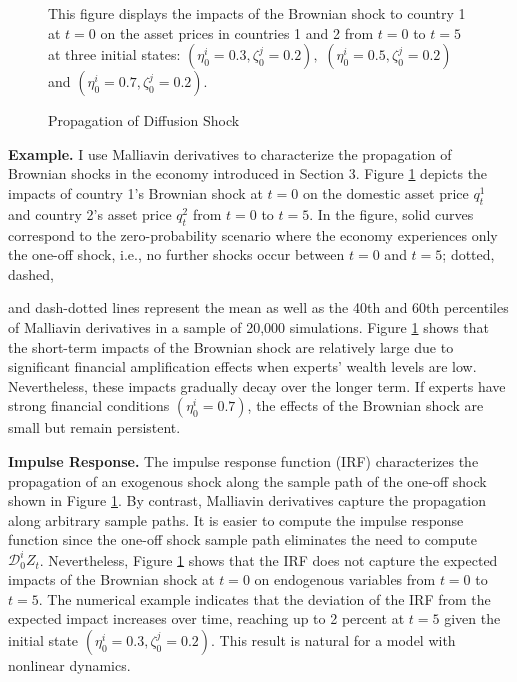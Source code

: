 \documentclass{article}
\begin{document}
\begin{figure}[h]
    \centering
    \caption{Propagation of Diffusion Shock}
    \label{fig:4}
    \small
    This figure displays the impacts of the Brownian shock to country 1 at $t=0$ on the asset prices in countries 1 and 2 from $t=0$ to $t=5$ at three initial states: $(\eta_{0}^{i}=0.3, \zeta_{0}^{j}=0.2),$ $(\eta_{0}^{i}=0.5, \zeta_{0}^{j}=0.2)$ and $(\eta_{0}^{i}=0.7, \zeta_{0}^{j}=0.2)$.
\end{figure}

\textbf{Example.} I use Malliavin derivatives to characterize the propagation of Brownian shocks in the economy introduced in Section 3. Figure \ref{fig:4} depicts the impacts of country 1's Brownian shock at $t=0$ on the domestic asset price $q_{t}^{1}$ and country 2's asset price $q_{t}^{2}$ from $t=0$ to $t=5$. In the figure, solid curves correspond to the zero-probability scenario where the economy experiences only the one-off shock, i.e., no further shocks occur between $t=0$ and $t=5$; dotted, dashed,

\clearpage

and dash-dotted lines represent the mean as well as the 40th and 60th percentiles of Malliavin derivatives in a sample of 20,000 simulations. Figure \ref{fig:4} shows that the short-term impacts of the Brownian shock are relatively large due to significant financial amplification effects when experts' wealth levels are low. Nevertheless, these impacts gradually decay over the longer term. If experts have strong financial conditions $(\eta_{0}^{i}=0.7)$, the effects of the Brownian shock are small but remain persistent.

\textbf{Impulse Response.} The impulse response function (IRF) characterizes the propagation of an exogenous shock along the sample path of the one-off shock shown in Figure \ref{fig:4}. By contrast, Malliavin derivatives capture the propagation along arbitrary sample paths. It is easier to compute the impulse response function since the one-off shock sample path eliminates the need to compute $\mathcal{D}_{0}^{i}Z_{t}$. Nevertheless, Figure \ref{fig:4} shows that the IRF does not capture the expected impacts of the Brownian shock at $t=0$ on endogenous variables from $t=0$ to $t=5$. The numerical example indicates that the deviation of the IRF from the expected impact increases over time, reaching up to 2 percent at $t=5$ given the initial state $(\eta_{0}^{i}=0.3, \zeta_{0}^{j}=0.2)$. This result is natural for a model with nonlinear dynamics.
\end{document}
